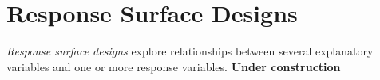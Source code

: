 \documentclass[12pt,english]{article}\usepackage[]{graphicx}\usepackage[table]{xcolor}
\begin{document}
\section{Response Surface Designs}
\textit{Response surface designs} explore relationships between several explanatory variables and one or more response variables. \textbf{Under construction}


\end{document}
